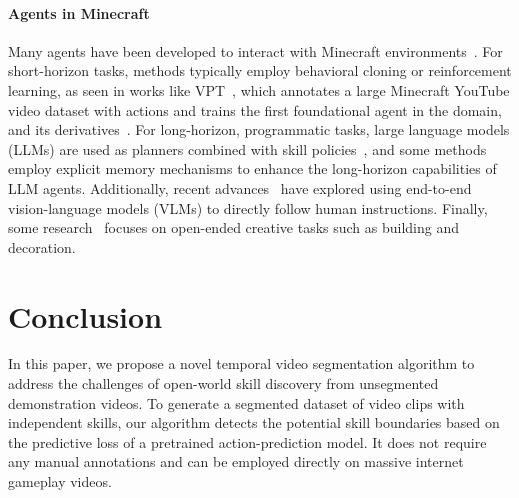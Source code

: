 \paragraph{Agents in Minecraft} 
Many agents have been developed to interact with Minecraft environments~\citep{zhao2024optimizing,jiang2025reinforcement}. For short-horizon tasks, methods typically employ behavioral cloning or reinforcement learning, as seen in works like VPT~\citep{vpt}, which annotates a large Minecraft YouTube video dataset with actions and trains the first foundational agent in the domain, and its derivatives~\citep{steve1,groot1,yuan2024pre,cai2023open,li2025jarvis}. For long-horizon, programmatic tasks, large language models (LLMs) are used as planners combined with skill policies~\citep{deps,minedreamer,plan4mc,mp5,jarvis-1,li2024optimus,ui-tars-15-seed}, and some methods~\citep{jarvis-1,gitm,voyager} employ explicit memory mechanisms to enhance the long-horizon capabilities of LLM agents. Additionally, recent advances~\citep{omnijarvis,steve2} have explored using end-to-end vision-language models (VLMs) to directly follow human instructions. Finally, some research~\citep{luban,zhang2023creative} focuses on open-ended creative tasks such as building and decoration.

\section{Conclusion}
\label{sec:conclusion}

In this paper, we propose a novel temporal video segmentation algorithm to address the challenges of open-world skill discovery from unsegmented demonstration videos. To generate a segmented dataset of video clips with independent skills, our algorithm detects the potential skill boundaries based on the predictive loss of a pretrained action-prediction model. 
It does not require any manual annotations and can be employed directly on massive internet gameplay videos. 
